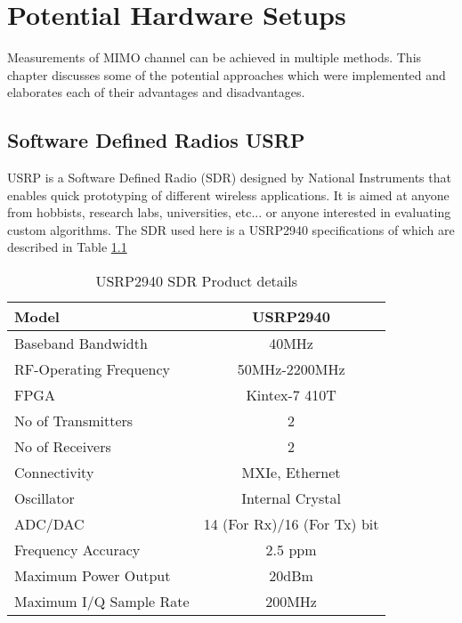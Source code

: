 \chapter{Potential Hardware Setups}
\label{ch:PotenHWSetup}

Measurements of MIMO channel can be achieved in multiple methods. This chapter discusses some of the potential approaches which were implemented and elaborates each of their advantages and disadvantages.

\section{Software Defined Radios USRP}\label{sec:USRP}

USRP is a Software Defined Radio (SDR) designed by National Instruments that enables quick prototyping of different wireless applications. It is aimed at anyone from hobbists, research labs, universities, etc... or anyone interested in evaluating custom algorithms. The SDR used here is a USRP2940 specifications of which are described in Table \ref{tb:USRP}

\begin{table}[H]
    \begin{center}
        \begin{tabular}{|l|c|}
        \hline
            Model                   & USRP2940          \\ \hline
            Baseband Bandwidth      & 40MHz             \\ \hline
            RF-Operating Frequency  & 50MHz-2200MHz     \\ \hline
            FPGA                    & Kintex-7 410T     \\ \hline
            No of Transmitters      & 2                 \\ \hline
            No of Receivers         & 2                 \\ \hline
            Connectivity            & MXIe, Ethernet    \\ \hline
            Oscillator              & Internal Crystal  \\ \hline
            ADC/DAC                 & 14 (For Rx)/16 (For Tx) bit         \\ \hline
            Frequency Accuracy      & 2.5 ppm           \\ \hline
            Maximum Power Output    & 20dBm             \\ \hline
            Maximum I/Q Sample Rate & 200MHz            \\ \hline
        \end{tabular}
    \end{center}
    \caption{USRP2940 SDR Product details}
    \label{tb:USRP}
\end{table}

